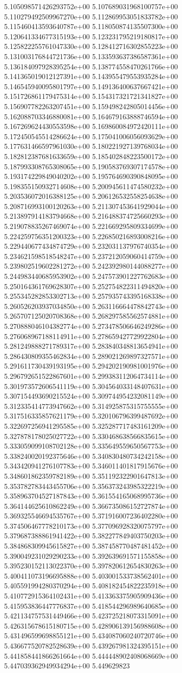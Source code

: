 5.105098571426293752e+00	5.107689031968100757e+00	5.110279492509967270e+00	5.112869953051833782e+00	5.115460413593640787e+00	5.118050874135507300e+00	5.120641334677315193e+00	5.123231795219180817e+00	5.125822255761047330e+00	5.128412716302855223e+00	5.131003176844721736e+00	5.133593637386587361e+00	5.136184097928395254e+00	5.138774558470261766e+00	5.141365019012127391e+00	5.143955479553935284e+00	5.146545940095801797e+00	5.149136400637667421e+00	5.151726861179475314e+00	5.154317321721341827e+00	5.156907782263207451e+00	5.159498242805014456e+00	5.162088703346880081e+00	5.164679163888746594e+00	5.167269624430553598e+00	5.169860084972420111e+00	5.172450545514286624e+00	5.175041006056093629e+00	5.177631466597961030e+00	5.180221927139768034e+00	5.182812387681633659e+00	5.185402848223500172e+00	5.187993308765308065e+00	5.190583769307174578e+00	5.193174229849040202e+00	5.195764690390848095e+00	5.198355150932714608e+00	5.200945611474580232e+00	5.203536072016388125e+00	5.206126532558254638e+00	5.208716993100120263e+00	5.211307453641929044e+00	5.213897914183794668e+00	5.216488374725660293e+00	5.219078835267469074e+00	5.221669295809334699e+00	5.224259756351200323e+00	5.226850216893008216e+00	5.229440677434874729e+00	5.232031137976740354e+00	5.234621598518548247e+00	5.237212059060414759e+00	5.239802519602281272e+00	5.242392980144088277e+00	5.244983440685953902e+00	5.247573901227762683e+00	5.250164361769628307e+00	5.252754822311494820e+00	5.255345282853302713e+00	5.257935743395168338e+00	5.260526203937034850e+00	5.263116664478842743e+00	5.265707125020708368e+00	5.268297585562574881e+00	5.270888046104382774e+00	5.273478506646249286e+00	5.276068967188114911e+00	5.278659427729922804e+00	5.281249888271789317e+00	5.283840348813654941e+00	5.286430809355462834e+00	5.289021269897327571e+00	5.291611730439193195e+00	5.294202190981001976e+00	5.296792651522867601e+00	5.299383112064734114e+00	5.301973572606541119e+00	5.304564033148407631e+00	5.307154493690215524e+00	5.309744954232081149e+00	5.312335414773947662e+00	5.314925875315755555e+00	5.317516335857621179e+00	5.320106796399487692e+00	5.322697256941295585e+00	5.325287717483161209e+00	5.327878178025027722e+00	5.330468638566835615e+00	5.333059099108702128e+00	5.335649559650567753e+00	5.338240020192375646e+00	5.340830480734242158e+00	5.343420941276107783e+00	5.346011401817915676e+00	5.348601862359782189e+00	5.351192322901647813e+00	5.353782783443455706e+00	5.356373243985322219e+00	5.358963704527187843e+00	5.361554165068995736e+00	5.364144625610862249e+00	5.366735086152727874e+00	5.369325546694535767e+00	5.371916007236402280e+00	5.374506467778210173e+00	5.377096928320075797e+00	5.379687388861941422e+00	5.382277849403750203e+00	5.384868309945615827e+00	5.387458770487481452e+00	5.390049231029290233e+00	5.392639691571155858e+00	5.395230152113022370e+00	5.397820612654830263e+00	5.400411073196695888e+00	5.403001533738562401e+00	5.405591994280370294e+00	5.408182454822235918e+00	5.410772915364102431e+00	5.413363375905909436e+00	5.415953836447776837e+00	5.418544296989640685e+00	5.421134757531449466e+00	5.423725218073315091e+00	5.426315678615180715e+00	5.428906139156988608e+00	5.431496599698855121e+00	5.434087060240720746e+00	5.436677520782528639e+00	5.439267981324395151e+00	5.441858441866261664e+00	5.444448902408068669e+00	5.447039362949934294e+00	5.449629823